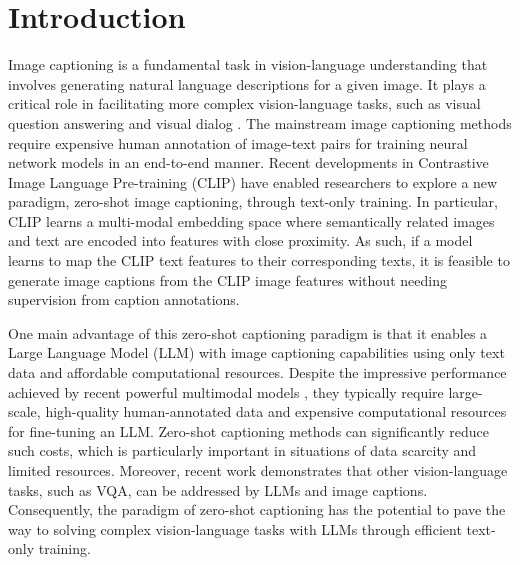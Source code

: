 \section{Introduction}
Image captioning is a fundamental task in vision-language understanding that involves generating natural language descriptions for a given image. It plays a critical role in facilitating more complex vision-language tasks, such as visual question answering \cite{Agrawal2015VQAVQ,gqa,okvqa} and visual dialog \cite{Das2016VisualD,Niu2018RecursiveVA,llava}.
The mainstream image captioning methods \cite{conimgcap4,conimgcap1,conimgcap3,conimgcap2} require expensive human annotation of image-text pairs for training neural network models in an end-to-end manner. Recent developments in Contrastive Image Language Pre-training (CLIP) \cite{clip} have enabled researchers to explore a new paradigm, zero-shot image captioning, through text-only training. In particular, CLIP learns a multi-modal embedding space where semantically related images and text are encoded into features with close proximity. As such, if a model learns to map the CLIP text features to their corresponding texts, it is feasible to generate image captions from the CLIP image features without needing supervision from caption annotations.


One main advantage of this zero-shot captioning paradigm is that it enables a Large Language Model (LLM) \cite{gpt3, Zhang2022OPTOP} with image captioning capabilities using only text data and affordable computational resources. Despite the impressive performance achieved by recent powerful multimodal models \cite{miniGPT4,llava}, they typically require large-scale, high-quality human-annotated data and expensive computational resources for fine-tuning an LLM. Zero-shot captioning methods can significantly reduce such costs, which is particularly important in situations of data scarcity and limited resources. Moreover, recent work \cite{Guo2022FromIT, Changpinyo2022AllYM,Tiong2022PlugandPlayVZ} demonstrates that other vision-language tasks, such as VQA, can be addressed by LLMs and image captions. Consequently, the paradigm of zero-shot captioning has the potential to pave the way to solving complex vision-language tasks with LLMs through efficient text-only training. 


